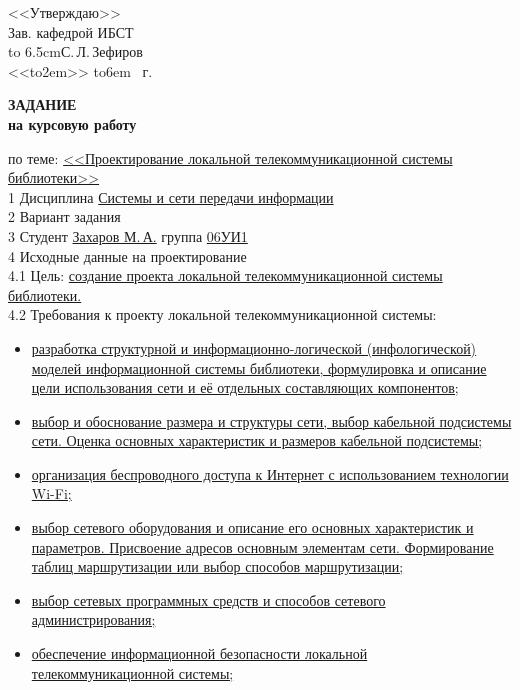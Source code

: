 \hfill\parbox{6.5cm}{<<Утверждаю>>\\
  Зав. кафедрой ИБСТ\\
  \hbox to 6.5cm{\hrulefill С.\,Л.\,Зефиров}\\
  \def\hrf#1{\hbox to#1{\hrulefill}}
  <<\hrf{2em}>> \hrf{6em} \the\year~г.}	
	
\begin{center}\textbf{\normalfont\bfseries\large ЗАДАНИЕ}\\\textbf{на
    курсовую работу}\end{center}

\begin{singlespace}
\noindent по теме: \uline{<<Проектирование локальной телекоммуникационной системы библиотеки>>\hfill}\\
1 Дисциплина \uline{\qquad Системы и сети передачи информации\hfill}\\
2 Вариант задания \uline{\hfill}\\
3 Студент \uline{\qquad Захаров М.\,А.\qquad } группа \uline{\qquad 06УИ1\hfill}\\
4 Исходные данные на проектирование\\
4.1 Цель: \uline{создание проекта локальной телекоммуникационной системы библиотеки.\hfill\quad}\\
4.2 Требования к проекту локальной телекоммуникационной системы:
\begin{itemize}
\item \uline{разработка структурной и информационно-логической (инфо\-логической) моделей информационной системы библиотеки, формулировка и описание цели использования сети и её от\-дельных составляющих компонентов; \hfill \quad}
\item \uline{выбор и обоснование размера и структуры сети, выбор кабель\-ной подсистемы сети. Оценка основных характеристик и раз\-меров кабельной подсистемы;\hfill \quad}
\item \uline{организация беспроводного доступа к Интернет с использова\-нием технологии Wi-Fi; \hfill \quad}
\item \uline{выбор сетевого оборудования и описание его основных харак\-теристик и параметров. Присвоение адресов основным эле\-ментам сети. Формирование таблиц маршрутизации или вы\-бор способов маршрутизации; \hfill \quad}
\item \uline{выбор сетевых программных средств и способов сетевого ад\-министрирования; \hfill \quad}
\item \uline{обеспечение информационной безопасности локальной теле\-коммуникационной системы; \hfill \quad}

\end{itemize}
\end{singlespace}
